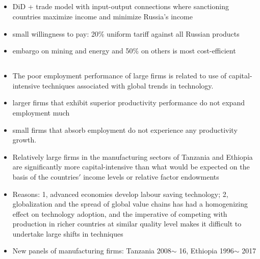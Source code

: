 \documentclass[10pt]{article} %
\begin{document}
    \subsection{\cite{deSouzaetal2022}}
    \begin{itemize}
        \item DiD + trade model with input-output connections where sanctioning countries maximize income and minimize Russia's income
        \item small willingness to pay: 20\% uniform tariff against all Russian products
        \item embargo on mining and energy and 50\% on others is most cost-efficient
    \end{itemize}

    \subsection{\cite{DiaoElllisMcMillanRodrik2021}}
    \begin{itemize}
        \item The poor employment performance of large firms is related to use of capital-intensive techniques associated with global trends in technology.
        \item larger firms that exhibit superior productivity performance do not expand employment much
        \item small firms that absorb employment do not experience any productivity growth. 
        \item Relatively large firms in the manufacturing sectors of Tanzania and Ethiopia are significantly more capital-intensive than what would be expected on the basis of the countries$\prime$ income levels or relative factor endowments
        \item Reasons: 1, advanced economies develop labour saving technology; 2, globalization and the spread of global value chains has had a homogenizing effect on technology adoption, and the imperative of competing with production in richer countries at similar quality level makes it difficult to undertake large shifts in techniques
        \item New panels of manufacturing firms: Tanzania 2008$\sim$ 16, Ethiopia 1996$\sim$ 2017
    \end{itemize}
\end{document}
